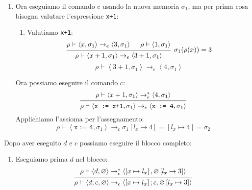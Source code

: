 \documentclass[a4paper]{article}
\begin{document}
\begin{example}
\begin{itemize}
\begin{enumerate}
        \item Ora eseguiamo il comando \( c \) usando la nuova memoria \( \sigma_1 \),
          ma per prima cosa bisogna valutare l'espressione \texttt{x+1}:
          \begin{enumerate}
            \item Valutiamo \texttt{x+1}:
              \[
                \begin{prooftree}
                  \hypo{ 
                    \rho \vdash \left< x, \sigma_1 \right>
                    \to_e
                    \left< 3, \sigma_1 \right>
                  }
                  \hypo{ 
                    \rho \vdash \left< 1, \sigma_1 \right>
                  }
                  \infer2[\( 
                    \sigma_1(\rho(x)) = 3
                  \)]{
                    \rho \vdash \left< x+1, \sigma_1 \right>
                    \to_e
                    \left< 3 + 1, \sigma_1 \right>
                  }
                \end{prooftree}
              \] 
              \[
                \rho \vdash \left< 3 + 1, \sigma_1 \right>
                \to_e
                \left< 4, \sigma_1 \right>
              \] 
          \end{enumerate}
          Ora possiamo eseguire il comando \( c \):
          \[
            \begin{prooftree}
              \hypo{ 
                \rho \vdash \left< x+1, \sigma_1 \right>
                \to^*_e
                \left< 4, \sigma_1 \right>
              }
              \infer1{ 
                \rho \vdash \left< \texttt{x := x+1}, \sigma_1 \right>
                \to_c
                \left< \texttt{x := 4}, \sigma_1 \right>
              }
            \end{prooftree}
          \] 
          Applichiamo l'assioma per l'assegnamento:
          \[
            \rho \vdash \left< \texttt{x := 4}, \sigma_1 \right>
            \to_c
            \sigma_1[l_x \mapsto 4] = \left[ l_x \mapsto 4 \right] = \sigma_2
          \] 
      \end{enumerate}
      Dopo aver eseguito \( d \) e \( c \) possiamo eseguire il blocco completo:
      \begin{enumerate}
        \item Eseguiamo prima \( d \) nel blocco:
          \[
            \begin{prooftree}
              \hypo{ 
                \rho \vdash \left< d, \varnothing \right>
                \to_c^*
                \left< \left[ x \mapsto l_x \right], \varnothing\left[ l_x \mapsto 3 \right] \right>
              }
              \infer1{ 
                \rho \vdash \left< d;c, \varnothing \right>
                \to_c
                \left< \left[ x \mapsto l_x \right]; c, \varnothing\left[ l_x \mapsto 3 \right] \right>
              }
            \end{prooftree}
          \] 


\end{enumerate}
\end{itemize}
\end{example}
\end{document}
